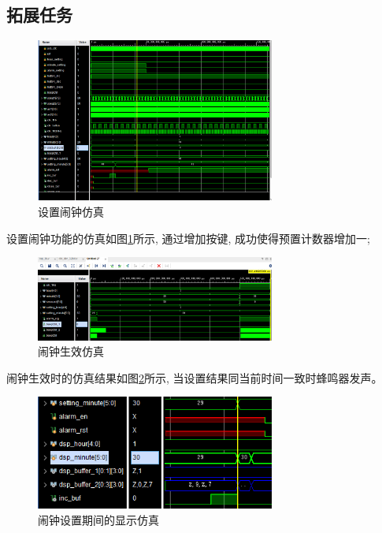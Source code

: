\documentclass{article}
\begin{document}
\subsection*{拓展任务}
\begin{figure}[htbp]
    \centering
    \includegraphics[width=0.7\textwidth]{image/2024-06-25-21-56-47.png}
    \caption{设置闹钟仿真}
    \label{image_alarm_sim_1}
\end{figure}
设置闹钟功能的仿真如图\ref{image_alarm_sim_1}所示, 通过增加按键, 成功使得预置计数器增加一;
\begin{figure}[htbp]
    \centering
    \includegraphics[width=0.7\textwidth]{image/2024-06-25-22-07-02.png}
    \caption{闹钟生效仿真}
    \label{image_alarm_sim_2}
\end{figure}
闹钟生效时的仿真结果如图\ref{image_alarm_sim_2}所示, 当设置结果同当前时间一致时蜂鸣器发声。
\begin{figure}[htbp]
    \centering
    \includegraphics[width=0.7\textwidth]{image/2024-06-25-22-13-26.png}
    \caption{闹钟设置期间的显示仿真}
    \label{image_alarm_sim_3}
\end{figure}
\end{document}

